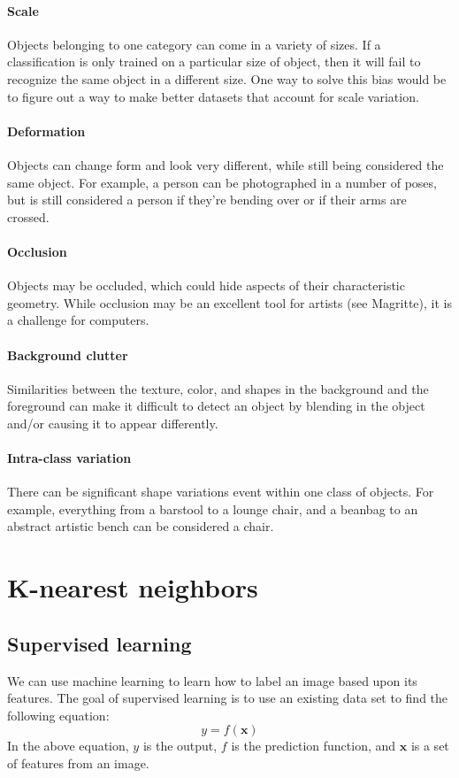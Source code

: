 \documentclass{article}
\begin{document}
\paragraph{Scale} Objects belonging to one category can come in a variety of sizes. If a classification is only trained on a particular size of object, then it will fail to recognize the same object in a different size. One way to solve this bias would be to figure out a way to make better datasets that account for scale variation.

\paragraph{Deformation} Objects can change form and look very different, while still being considered the same object. For example, a person can be photographed in a number of poses, but is still considered a person if they're bending over or if their arms are crossed.

\paragraph{Occlusion} Objects may be occluded, which could hide aspects of their characteristic geometry. While occlusion may be an excellent tool for artists (see Magritte), it is a challenge for computers.

\paragraph{Background clutter} Similarities between the texture, color, and shapes in the background and the foreground can make it difficult to detect an object by blending in the object and/or causing it to appear differently.

\paragraph{Intra-class variation} There can be significant shape variations event within one class of objects. For example, everything from a barstool to a lounge chair, and a beanbag to an abstract artistic bench can be considered a chair. 

\section{K-nearest neighbors}

\subsection{Supervised learning}
We can use machine learning to learn how to label an image based upon its features. The goal of supervised learning is to use an existing data set to find the following equation:
\begin{equation}
y=f(\mathbf{x})
\end{equation}
In the above equation, $y$ is the output, $f$ is the prediction function, and $\mathbf{x}$ is a set of features from an image.\\
\end{document}
